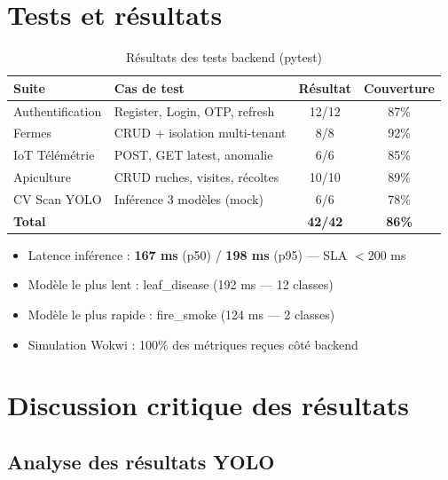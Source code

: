 \documentclass[12pt,a4paper,oneside]{report}
\newcommand{\yes}{\ding{52}}
\begin{document}
\section{Tests et résultats}

\begin{table}[H]\centering
\caption{Résultats des tests backend (pytest)}
\label{tab:tests}
\begin{tabular}{llcc}
\toprule
\textbf{Suite}&\textbf{Cas de test}&\textbf{Résultat}&\textbf{Couverture}\\
\midrule
Authentification  & Register, Login, OTP, refresh  & 12/12 & 87\%\\
Fermes            & CRUD + isolation multi-tenant  & 8/8   & 92\%\\
IoT Télémétrie    & POST, GET latest, anomalie     & 6/6   & 85\%\\
Apiculture        & CRUD ruches, visites, récoltes & 10/10 & 89\%\\
CV Scan YOLO      & Inférence 3 modèles (mock)     & 6/6   & 78\%\\
\midrule
\textbf{Total}    &                                &\textbf{42/42}&\textbf{86\%}\\
\bottomrule
\end{tabular}
\end{table}

\begin{tcolorbox}[infobox,title={Performance YOLO sur CPU Intel Core i7}]
\begin{itemize}
  \item Latence inférence : \textbf{167 ms} (p50) / \textbf{198 ms} (p95) — SLA $<$200 ms \yes
  \item Modèle le plus lent : leaf\_disease (192 ms — 12 classes)
  \item Modèle le plus rapide : fire\_smoke (124 ms — 2 classes)
  \item Simulation Wokwi : 100\% des métriques reçues côté backend
\end{itemize}
\end{tcolorbox}

\section{Discussion critique des résultats}

\subsection{Analyse des résultats YOLO}
\end{document}
